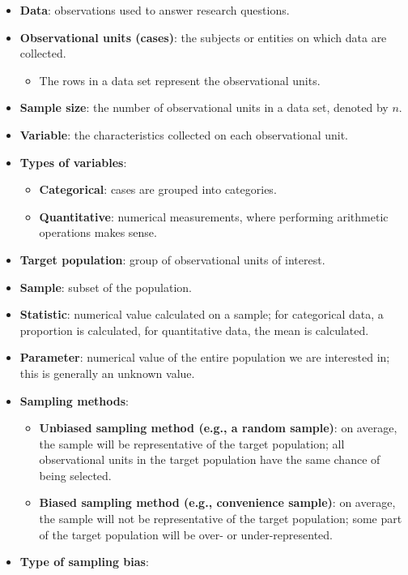 \documentclass[
]{report}
\providecommand{\tightlist}{%
  \setlength{\itemsep}{0pt}\setlength{\parskip}{0pt}}
\begin{document}
\begin{itemize}
\item
  \textbf{Data}: observations used to answer research questions.
\item
  \textbf{Observational units (cases)}: the subjects or entities on which data are collected.

  \begin{itemize}
  \tightlist
  \item
    The rows in a data set represent the observational units.
  \end{itemize}
\item
  \textbf{Sample size}: the number of observational units in a data set, denoted by \(n\).
\item
  \textbf{Variable}: the characteristics collected on each observational unit.
\item
  \textbf{Types of variables}:

  \begin{itemize}
  \item
    \textbf{Categorical}: cases are grouped into categories.
  \item
    \textbf{Quantitative}: numerical measurements, where performing arithmetic operations makes sense.
  \end{itemize}
\item
  \textbf{Target population}: group of observational units of interest.
\item
  \textbf{Sample}: subset of the population.
\item
  \textbf{Statistic}: numerical value calculated on a sample; for categorical data, a proportion is calculated, for quantitative data, the mean is calculated.
\item
  \textbf{Parameter}: numerical value of the entire population we are interested in; this is generally an unknown value.
\item
  \textbf{Sampling methods}:

  \begin{itemize}
  \item
    \textbf{Unbiased sampling method (e.g., a random sample)}: on average, the sample will be representative of the target population; all observational units in the target population have the same chance of being selected.
  \item
    \textbf{Biased sampling method (e.g., convenience sample)}: on average, the sample will not be representative of the target population; some part of the target population will be over- or under-represented.
  \end{itemize}
\item
  \textbf{Type of sampling bias}:


\end{itemize}
\end{document}
